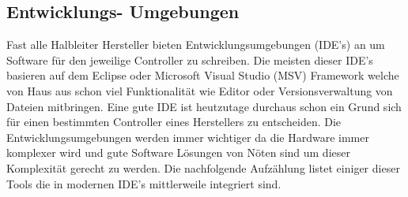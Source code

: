 \documentclass[MES,Master,ngerman]{twbook}%
\begin{document}
\subsection{Entwicklungs- Umgebungen}
Fast alle Halbleiter Hersteller bieten Entwicklungsumgebungen (IDE's) an um Software für den jeweilige Controller zu schreiben. Die meisten dieser IDE's basieren auf dem Eclipse oder Microsoft Visual Studio (MSV) Framework welche von Haus aus schon viel Funktionalität wie Editor oder Versionsverwaltung von Dateien mitbringen. Eine gute IDE ist heutzutage durchaus schon ein Grund sich für einen bestimmten Controller eines Herstellers zu entscheiden. Die Entwicklungsumgebungen werden immer wichtiger da die Hardware immer komplexer wird und gute Software Lösungen von Nöten sind um dieser Komplexität gerecht zu werden. Die nachfolgende Aufzählung listet einiger dieser Tools die in modernen IDE's mittlerweile integriert sind. 
\end{document}
